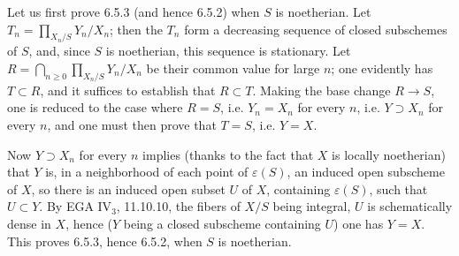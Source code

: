 Let us first prove 6.5.3 (and hence 6.5.2) when $S$ is noetherian. Let $T_n=\prod_{X_n/S}Y_n/X_n$; then the $T_n$ form a decreasing sequence of closed subschemes of $S$, and, since $S$ is noetherian, this sequence is stationary. Let $R=\bigcap_{n\ge0}\prod_{X_n/S}Y_n/X_n$ be their common value for large $n$; one evidently has $T\subset R$, and it suffices to establish that $R\subset T$. Making the base change $R\to S$, one is reduced to the case where $R=S$, i.e. $Y_n=X_n$ for every $n$, i.e. $Y\supset X_n$ for every $n$, and one must then prove that $T=S$, i.e. $Y=X$.

Now $Y\supset X_n$ for every $n$ implies (thanks to the fact that $X$ is locally noetherian) that $Y$ is, in a neighborhood of each point of $\varepsilon(S)$, an induced open subscheme of $X$, so there is an induced open subset $U$ of $X$, containing $\varepsilon(S)$, such that $U\subset Y$. By EGA IV$_3$, 11.10.10, the fibers of $X/S$ being integral, $U$ is schematically dense in $X$, hence ($Y$ being a closed subscheme containing $U$) one has $Y=X$. This proves 6.5.3, hence 6.5.2, when $S$ is noetherian.
